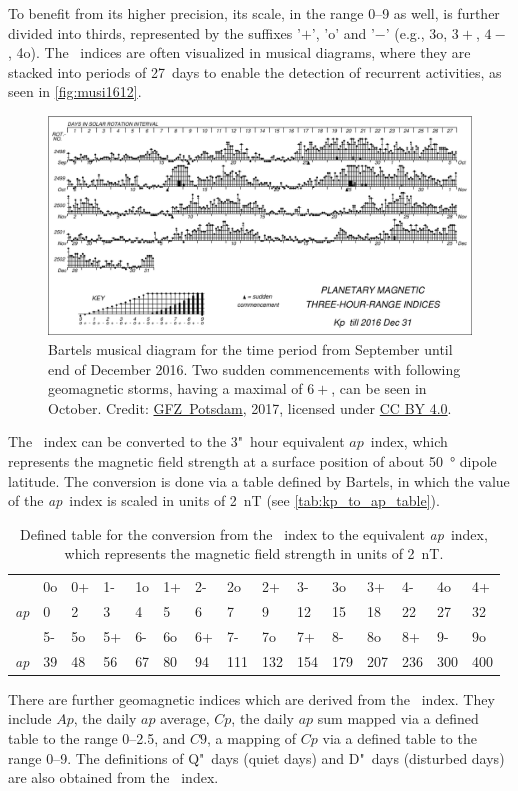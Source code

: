 To benefit from its higher precision, its scale, in the range 0--9 as well, is further divided into thirds, represented by the suffixes '$+$', 'o' and '$-$' (e.g., 3o, $3+$, $4-$, 4o). The \Kp{}~indices are often visualized in musical diagrams, where they are stacked into periods of 27~days to enable the detection of recurrent activities, as seen in \autoref{fig:musi1612}.
\begin{figure}[htb]
	\centering
	\includegraphics[width=\textwidth]{images/musi1612.pdf}
	\caption{Bartels musical \Kp{} diagram for the time period from September until end of December 2016. Two sudden commencements with following geomagnetic storms, having a maximal \Kp{} of $6+$, can be seen in October. Credit: \href{http://www.gfz-potsdam.de/en/kp-index/}{GFZ~Potsdam}, 2017, licensed under \href{https://creativecommons.org/licenses/by/4.0/}{CC BY 4.0}.}
	\label{fig:musi1612}
\end{figure}

The \Kp{}~index can be converted to the 3"~hour equivalent $ap$~index, which represents the magnetic field strength at a surface position of about \SI{50}{\degree} dipole latitude. The conversion is done via a table defined by Bartels, in which the value of the \textit{ap}~index is scaled in units of \SI{2}{nT} (see \autoref{tab:kp_to_ap_table}).
\begin{table}
	\caption{Defined table for the conversion from the \Kp~index to the equivalent \textit{ap}~index, which represents the magnetic field strength in units of \SI{2}{nT}.}
	\label{tab:kp_to_ap_table}
	\centering
	\begin{tabular}{lssssssssssssss}
		\Kp	&0o	&0+	&1-	&1o	&1+	&2-	&2o	&2+	&3-	&3o	&3+	&4-	&4o	&4+\\
		\textit{ap}	&0	&2	&3	&4	&5	&6	&7	&9	&12	&15	&18	&22	&27	&32\\
		\hline
		\Kp	&5-	&5o	&5+	&6-	&6o	&6+	&7-	&7o	&7+	&8-	&8o	&8+	&9-	&9o\\
		\textit{ap}	&39	&48	&56	&67	&80	&94	&111	&132	&154	&179	&207	&236	&300	&400
	\end{tabular}
\end{table}
There are further geomagnetic indices which are derived from the \Kp{}~index. They include $Ap$, the daily $ap$ average, $Cp$, the daily $ap$ sum mapped via a defined table to the range \numrange{0}{2.5}, and $C9$, a mapping of $Cp$ via a defined table to the range \numrange{0}{9}. The definitions of Q"~days (quiet days) and D"~days (disturbed days) are also obtained from the \Kp{}~index.

